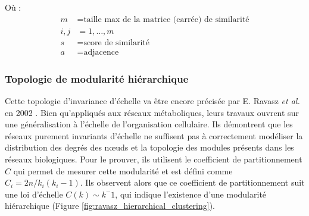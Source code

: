 Où :
\begin{align*}
    m &= \text{taille max de la matrice (carrée) de similarité} \\
    i, j &= 1, \dots, m \\
    s &= \text{score de similarité} \\
    a &= \text{adjacence}
\end{align*}


\subsubsection{Topologie de modularité hiérarchique}

Cette topologie d'invariance d'échelle va être encore précisée par E. Ravasz \textit{et al.} en 2002 \cite{Ravasz2002}. Bien qu'appliqués aux réseaux métaboliques, leurs travaux ouvrent sur une généralisation à l'échelle de l'organisation cellulaire. Ils démontrent que les réseaux purement invariants d'échelle ne suffisent pas à correctement modéliser la distribution des degrés des nœuds et la topologie des modules présents dans les réseaux biologiques. Pour le prouver, ils utilisent le coefficient de partitionnement $C$ qui permet de mesurer cette modularité et est défini comme $C_{i}=2 n / k_{i}\left(k_{i}-1\right)$. Ils observent alors que ce coefficient de partitionnement suit une loi d'échelle $C(k) \sim k^-1$, qui indique l'existence d'une modularité hiérarchique (Figure \ref{fig:ravasz_hierarchical_clustering}).

